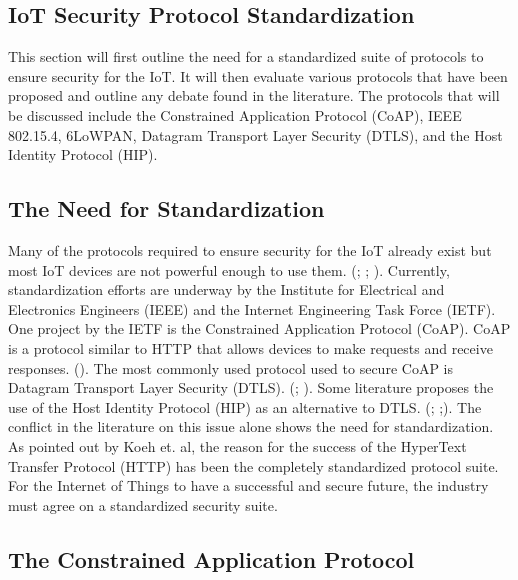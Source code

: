 \documentclass[letterpaper, 12pt]{article}
\begin{document}
\begin{flushleft}
\section*{IoT Security Protocol Standardization}

This section will first outline the need for a standardized suite of protocols to ensure security for the IoT. It will then evaluate various protocols
that have been proposed and outline any debate found in the literature. The protocols that will be discussed include the Constrained Application
Protocol (CoAP), IEEE 802.15.4, 6LoWPAN, Datagram Transport Layer Security (DTLS), and the Host Identity Protocol (HIP). 

\subsection*{The Need for Standardization}
Many of the protocols required to ensure security for the IoT already exist but most IoT devices are not powerful enough to use them. (\cite{Keoh6817545}; \cite{Granjal7005393}; \cite{Garcia-Morchon:2013:SII:2462096.2462117}). Currently, standardization efforts are underway by the
Institute for Electrical and Electronics Engineers (IEEE) and the Internet Engineering Task Force (IETF). One project by the IETF is the
Constrained Application Protocol (CoAP). CoAP is a protocol similar to HTTP that allows devices to make requests and receive responses. (\cite{Keoh6817545}). The most commonly used protocol used to secure CoAP is Datagram Transport Layer Security (DTLS). (\cite{Keoh6817545}; \cite{Garcia-Morchon:2013:SII:2462096.2462117}). 
Some literature proposes the use of the Host Identity Protocol (HIP) as an alternative to DTLS. (\cite{Hummen}; \cite{Garcia-Morchon:2013:SII:2462096.2462117};). The conflict in the literature on this issue alone shows the need for standardization. As pointed out by Koeh et. al, the reason for the success of the HyperText Transfer Protocol (HTTP) has been the completely standardized protocol suite. For the Internet
of Things to have a successful and secure future, the industry must agree on a standardized security suite.

\subsection*{The Constrained Application Protocol}



\end{flushleft}
\end{document}
